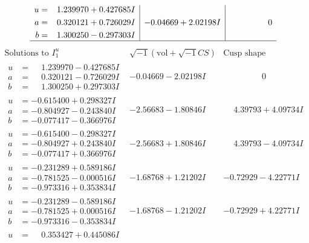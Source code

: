 \documentclass[1p]{elsarticle_modified}
\theoremstyle{definition}
\newcommand{\I}{\sqrt{-1}}
\begin{document}
$$\begin{array}{c|c|c}
\begin{aligned}
u &= \phantom{-}1.239970 + 0.427685 I \\
a &= \phantom{-}0.320121 + 0.726029 I \\
b &= \phantom{-}1.300250 - 0.297303 I\end{aligned}
 & -0.04669 + 2.02198 I & \phantom{-0.000000 } 0\\
 \hline 
 \end{array}$$\newpage$$\begin{array}{c|c|c}  
\text{Solutions to }I^u_{1}& \I (\text{vol} + \sqrt{-1}CS) & \text{Cusp shape}\\
 \hline 
\begin{aligned}
u &= \phantom{-}1.239970 - 0.427685 I \\
a &= \phantom{-}0.320121 - 0.726029 I \\
b &= \phantom{-}1.300250 + 0.297303 I\end{aligned}
 & -0.04669 - 2.02198 I & \phantom{-0.000000 } 0 \\ \hline\begin{aligned}
u &= -0.615400 + 0.298327 I \\
a &= -0.804927 - 0.243840 I \\
b &= -0.077417 - 0.366976 I\end{aligned}
 & -2.56683 - 1.80846 I & \phantom{-}4.39793 + 4.09734 I \\ \hline\begin{aligned}
u &= -0.615400 - 0.298327 I \\
a &= -0.804927 + 0.243840 I \\
b &= -0.077417 + 0.366976 I\end{aligned}
 & -2.56683 + 1.80846 I & \phantom{-}4.39793 - 4.09734 I \\ \hline\begin{aligned}
u &= -0.231289 + 0.589186 I \\
a &= -0.781525 - 0.000516 I \\
b &= -0.973316 + 0.353834 I\end{aligned}
 & -1.68768 + 1.21202 I & -0.72929 - 4.22771 I \\ \hline\begin{aligned}
u &= -0.231289 - 0.589186 I \\
a &= -0.781525 + 0.000516 I \\
b &= -0.973316 - 0.353834 I\end{aligned}
 & -1.68768 - 1.21202 I & -0.72929 + 4.22771 I \\ \hline\begin{aligned}
u &= \phantom{-}0.353427 + 0.445086 I \\

\end{aligned}
\end{array}$$
\end{document}
